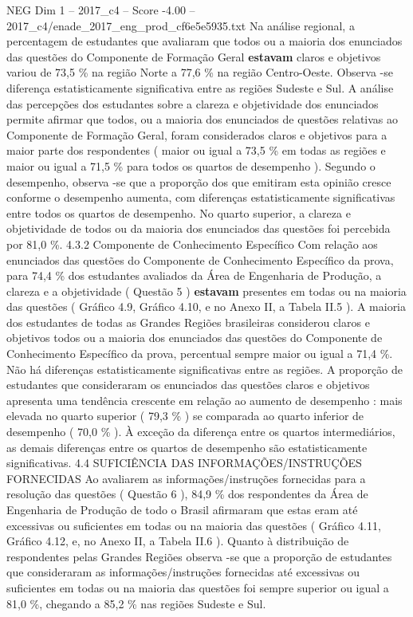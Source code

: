 \begin{textsample}{NEG Dim 1 – 2017\_c4 – Score -4.00 – 2017\_c4/enade\_2017\_eng\_prod\_cf6e5e5935.txt}
Na análise regional, a percentagem de estudantes que avaliaram que todos ou a maioria dos enunciados das questões do Componente de Formação Geral \textbf{estavam} claros e objetivos variou de 73,5 \% na região Norte a 77,6 \% na região Centro-Oeste.
Observa -se diferença estatisticamente significativa entre as regiões Sudeste e Sul.
A análise das percepções dos estudantes sobre a clareza e objetividade dos enunciados permite afirmar que todos, ou a maioria dos enunciados de questões relativas ao Componente de Formação Geral, foram considerados claros e objetivos para a maior parte dos respondentes ( maior ou igual a 73,5 \% em todas as regiões e maior ou igual a 71,5 \% para todos os quartos de desempenho ).
Segundo o desempenho, observa -se que a proporção dos que emitiram esta opinião cresce conforme o desempenho aumenta, com diferenças estatisticamente significativas entre todos os quartos de desempenho.
No quarto superior, a clareza e objetividade de todos ou da maioria dos enunciados das questões foi percebida por 81,0 \%. 4.3.2 Componente de Conhecimento Específico Com relação aos enunciados das questões do Componente de Conhecimento Específico da prova, para 74,4 \% dos estudantes avaliados da Área de Engenharia de Produção, a clareza e a objetividade ( Questão 5 ) \textbf{estavam} presentes em todas ou na maioria das questões ( Gráfico 4.9, Gráfico 4.10, e no Anexo II, a Tabela II.5 ).
A maioria dos estudantes de todas as Grandes Regiões brasileiras considerou claros e objetivos todos ou a maioria dos enunciados das questões do Componente de Conhecimento Específico da prova, percentual sempre maior ou igual a 71,4 \%.
Não há diferenças estatisticamente significativas entre as regiões.
A proporção de estudantes que consideraram os enunciados das questões claros e objetivos apresenta uma tendência crescente em relação ao aumento de desempenho : mais elevada no quarto superior ( 79,3 \% ) se comparada ao quarto inferior de desempenho ( 70,0 \% ).
À exceção da diferença entre os quartos intermediários, as demais diferenças entre os quartos de desempenho são estatisticamente significativas. 4.4 SUFICIÊNCIA DAS INFORMAÇÕES/INSTRUÇÕES FORNECIDAS Ao avaliarem as informações/instruções fornecidas para a resolução das questões ( Questão 6 ), 84,9 \% dos respondentes da Área de Engenharia de Produção de todo o Brasil afirmaram que estas eram até excessivas ou suficientes em todas ou na maioria das questões ( Gráfico 4.11, Gráfico 4.12, e, no Anexo II, a Tabela II.6 ).
Quanto à distribuição de respondentes pelas Grandes Regiões observa -se que a proporção de estudantes que consideraram as informações/instruções fornecidas até excessivas ou suficientes em todas ou na maioria das questões foi sempre superior ou igual a 81,0 \%, chegando a 85,2 \% nas regiões Sudeste e Sul.

\end{textsample}

